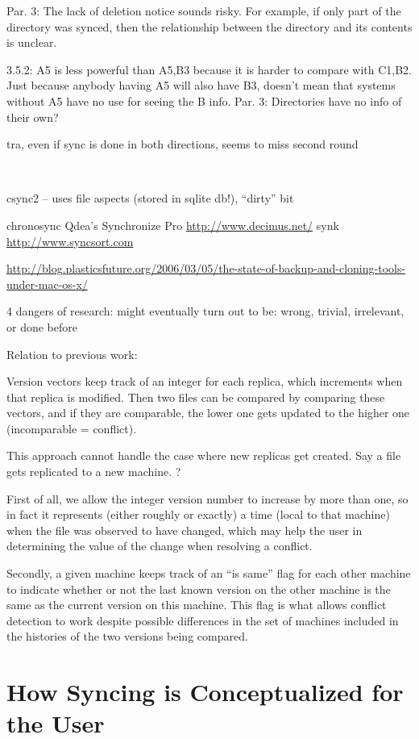 \documentclass{book}
\begin{document}
Par. 3: The lack of deletion notice sounds risky.  For example, if only part of the directory was synced, then the relationship between the directory and its contents is unclear.

3.5.2: {A5} is less powerful than {A5,B3} because it is harder to compare with {C1,B2}.  Just because anybody having A5 will also have B3, doesn't mean that systems without A5 have no use for seeing the B info.  Par. 3: Directories have no info of their own?

tra, even if sync is done in both directions, seems to miss second round

~

csync2 -- uses file aspects (stored in sqlite db!), ``dirty'' bit

chronosync
Qdea's Synchronize Pro
\url{http://www.decimus.net/}  synk
\url{http://www.syncsort.com}

\url{http://blog.plasticsfuture.org/2006/03/05/the-state-of-backup-and-cloning-tools-under-mac-os-x/}


4 dangers of research:  might eventually turn out to be:  wrong, trivial, irrelevant, or done before


Relation to previous work:

Version vectors keep track of an integer for each replica, which increments when that replica is modified.  Then two files can be compared by comparing these vectors, and if they are comparable, the lower one gets updated to the higher one (incomparable = conflict).

This approach cannot handle the case where new replicas get created.  Say a file gets replicated to a new machine.  ?

First of all, we allow the integer version number to increase by more than one, so in fact it represents (either roughly or exactly) a time (local to that machine) when the file was observed to have changed, which may help the user in determining the value of the change when resolving a conflict.

Secondly, a given machine keeps track of an ``is same'' flag for each other machine to indicate whether or not the last known version on the other machine is the same as the current version on this machine.  This flag is what allows conflict detection to work despite possible differences in the set of machines included in the histories of the two versions being compared.




\chapter{How Syncing is Conceptualized for the User}\label{chap:UI}
\end{document}
